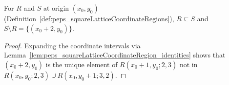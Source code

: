 \begin{lemma}%
    \label{lem:peps_normalSquareRegionR_regionS_difference}
    \leanok
    For $R$ and $S$ at origin $(x_0,y_0)$
    (Definition~\ref{def:peps_squareLatticeCoordinateRegions}), $R\subseteq S$
    and $S\setminus R=\{(x_0+2,y_0)\}$.
\end{lemma}
\begin{proof}\leanok
    Expanding the coordinate intervals via
    Lemma~\ref{lem:peps_squareLatticeCoordinateRegion_identities} shows that
    $(x_0+2,y_0)$ is the unique element of $R(x_0+1,y_0;2,3)$ not in
    $R(x_0,y_0;2,3)\cup R(x_0,y_0+1;3,2)$.
\end{proof}
